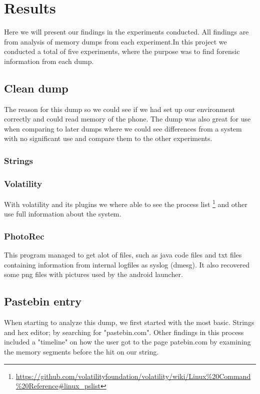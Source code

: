\section{Results}
Here we will present our findings in the experiments conducted. All findings are
from analysis of memory dumps from each experiment.In this project we conducted 
a total of five experiments, where the purpose was to find forensic information 
from each dump.

\subsection{Clean dump}
The reason for this dump so we could see if we had set up our environment 
correctly and could read memory of the phone. The dump was also great for use 
when comparing to later dumps where we could see differences from a system with 
no significant use and compare them to the other experiments.

  \subsubsection{Strings}

  \subsubsection{Volatility}
  With volatility and its plugins we where able to see the process list
  \footnote{\url{https://github.com/volatilityfoundation/volatility/wiki/Linux\%20Command\%20Reference\#linux\_pslist}} 
  and other use full information about the system.

  \subsubsection{PhotoRec}
  This program managed to get alot of files, such as java code files and txt 
  files containing information from internal logfiles as syslog (dmesg). It also 
  recovered some png files with pictures used by the android launcher.

\subsection{Pastebin entry}
When starting to analyze this dump, we first started with the most basic. 
Strings and hex editor; by searching for "pastebin.com". Other findings in this 
process included a "timeline" on how the user got to the page patebin.com by 
examining the memory segments before the hit on our string.

